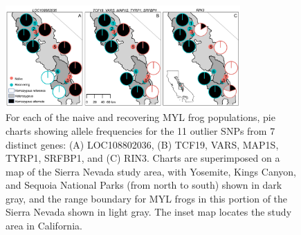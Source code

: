 \documentclass[9pt,twocolumn,twoside,lineno]{pnas-new}
\begin{document}
\showacknow{} %



\clearpage
\begin{figure}

{\centering \includegraphics[width=0.8\textwidth]{figures/allele_maps.png}

}

\caption{\label{fig-allelefrequencies}For each of the naive and
recovering MYL frog populations, pie charts showing allele frequencies
for the 11 outlier SNPs from 7 distinct genes: (A) LOC108802036, (B)
TCF19, VARS, MAP1S, TYRP1, SRFBP1, and (C) RIN3. Charts are superimposed
on a map of the Sierra Nevada study area, with Yosemite, Kings Canyon,
and Sequoia National Parks (from north to south) shown in dark gray, and
the range boundary for MYL frogs in this portion of the Sierra Nevada
shown in light gray. The inset map locates the study area in
California.}

\end{figure}

\newpage
\end{document}
